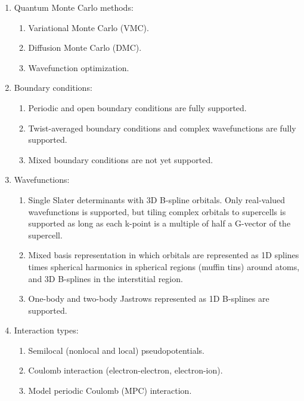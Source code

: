 \begin{enumerate}

  \item Quantum Monte Carlo methods:

    \begin{enumerate}
	\item Variational Monte Carlo (VMC).
	\item Diffusion Monte Carlo (DMC).
	\item Wavefunction optimization.
    \end{enumerate}

  \item Boundary conditions:

    \begin{enumerate}
	\item Periodic and open boundary conditions are fully supported.
	\item Twist-averaged boundary conditions and complex wavefunctions are fully supported. 
	\item Mixed boundary conditions are not yet supported.
    \end{enumerate}

  \item Wavefunctions:

    \begin{enumerate}
	\item Single Slater determinants with 3D B-spline orbitals. Only real-valued wavefunctions is supported, but tiling complex orbitals to supercells is supported as long as each k-point is a multiple of half a G-vector of the supercell.
	\item Mixed basis representation in which orbitals are represented as 1D splines times spherical harmonics in spherical regions (muffin tins) around atoms, and 3D B-splines in the interstitial region.
	\item One-body and two-body Jastrows represented as 1D B-splines are supported.
    \end{enumerate}

  \item Interaction types:

    \begin{enumerate}
	\item Semilocal (nonlocal and local) pseudopotentials.
	\item Coulomb interaction (electron-electron, electron-ion).
	\item Model periodic Coulomb (MPC) interaction.
    \end{enumerate}

\end{enumerate}


